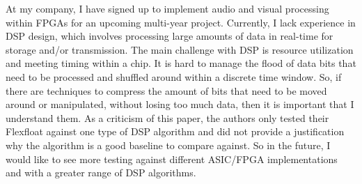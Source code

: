 \documentclass{article}
\begin{document}
At my company, I have signed up to implement audio and visual processing within FPGAs for an upcoming multi-year project. Currently, I lack experience in DSP design, which involves processing large amounts of data in real-time for storage and/or transmission. The main challenge with DSP is resource utilization and meeting timing within a chip. It is hard to manage the flood of data bits that need to be  processed and shuffled around within a discrete time window. So, if there are techniques to compress the amount of bits that need to be moved around or manipulated, without losing too much data, then it is important that I understand them. As a criticism of this paper, the authors only tested their Flexfloat against one type of DSP algorithm and did not provide a justification why the algorithm is a good baseline to compare against. So in the future, I would like to see more testing against different ASIC/FPGA implementations and with a greater range of DSP algorithms.

\nocite{*}



\end{document}
